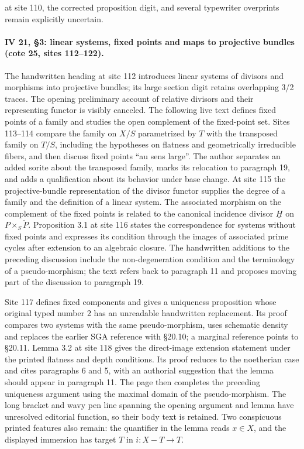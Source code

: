 \documentclass[10pt,a4paper]{article}
\begin{document}
at site 110, the corrected proposition digit, and several typewriter overprints remain explicitly uncertain.
\par{}

\par{}
\paragraph{IV 21, \S 3: linear systems, fixed points and maps to projective bundles (cote 25, sites 112--122).}
The handwritten heading at site 112 introduces linear systems of divisors and morphisms into projective bundles; its large section digit retains overlapping 3/2 traces. The opening preliminary account of relative divisors and their representing functor is visibly canceled. The following live text defines fixed points of a family and studies the open complement of the fixed-point set. Sites 113--114 compare the family on $X/S$ parametrized by $T$ with the transposed family on $T/S$, including the hypotheses on flatness and geometrically irreducible fibers, and then discuss fixed points ``au sens large''. The author separates an added sorite about the transposed family, marks its relocation to paragraph 19, and adds a qualification about its behavior under base change. At site 115 the projective-bundle representation of the divisor functor supplies the degree of a family and the definition of a linear system. The associated morphism on the complement of the fixed points is related to the canonical incidence divisor $\underline H$ on $P\times_S\check P$. Proposition 3.1 at site 116 states the correspondence for systems without fixed points and expresses its condition through the images of associated prime cycles after extension to an algebraic closure. The handwritten additions to the preceding discussion include the non-degeneration condition and the terminology of a pseudo-morphism; the text refers back to paragraph 11 and proposes moving part of the discussion to paragraph 19.

Site 117 defines fixed components and gives a uniqueness proposition whose original typed number 2 has an unreadable handwritten replacement. Its proof compares two systems with the same pseudo-morphism, uses schematic density and replaces the earlier SGA reference with \S 20.10; a marginal reference points to \S 20.11. Lemma 3.2 at site 118 gives the direct-image extension statement under the printed flatness and depth conditions. Its proof reduces to the noetherian case and cites paragraphs 6 and 5, with an authorial suggestion that the lemma should appear in paragraph 11. The page then completes the preceding uniqueness argument using the maximal domain of the pseudo-morphism. The long bracket and wavy pen line spanning the opening argument and lemma have unresolved editorial function, so their body text is retained. Two conspicuous printed features also remain: the quantifier in the lemma reads $x\in X$, and the displayed immersion has target $T$ in $i:X-T\to T$.
\end{document}
